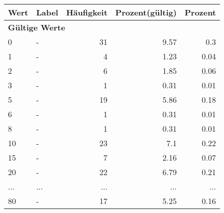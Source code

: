      \begin{longtable}{lXrrr}
     \toprule
     \textbf{Wert} & \textbf{Label} & \textbf{Häufigkeit} & \textbf{Prozent(gültig)} & \textbf{Prozent} \\
     \endhead
     \midrule
     \multicolumn{5}{l}{\textbf{Gültige Werte}}\\
        0 & \multicolumn{1}{X}{-} & %
          \num{31} &
          \num[round-mode=places,round-precision=2]{9,57} &
          \num[round-mode=places,round-precision=2]{0,3} \\
        1 & \multicolumn{1}{X}{-} & %
          \num{4} &
          \num[round-mode=places,round-precision=2]{1,23} &
          \num[round-mode=places,round-precision=2]{0,04} \\
        2 & \multicolumn{1}{X}{-} & %
          \num{6} &
          \num[round-mode=places,round-precision=2]{1,85} &
          \num[round-mode=places,round-precision=2]{0,06} \\
        3 & \multicolumn{1}{X}{-} & %
          \num{1} &
          \num[round-mode=places,round-precision=2]{0,31} &
          \num[round-mode=places,round-precision=2]{0,01} \\
        5 & \multicolumn{1}{X}{-} & %
          \num{19} &
          \num[round-mode=places,round-precision=2]{5,86} &
          \num[round-mode=places,round-precision=2]{0,18} \\
        6 & \multicolumn{1}{X}{-} & %
          \num{1} &
          \num[round-mode=places,round-precision=2]{0,31} &
          \num[round-mode=places,round-precision=2]{0,01} \\
        8 & \multicolumn{1}{X}{-} & %
          \num{1} &
          \num[round-mode=places,round-precision=2]{0,31} &
          \num[round-mode=places,round-precision=2]{0,01} \\
        10 & \multicolumn{1}{X}{-} & %
          \num{23} &
          \num[round-mode=places,round-precision=2]{7,1} &
          \num[round-mode=places,round-precision=2]{0,22} \\
        15 & \multicolumn{1}{X}{-} & %
          \num{7} &
          \num[round-mode=places,round-precision=2]{2,16} &
          \num[round-mode=places,round-precision=2]{0,07} \\
        20 & \multicolumn{1}{X}{-} & %
          \num{22} &
          \num[round-mode=places,round-precision=2]{6,79} &
          \num[round-mode=places,round-precision=2]{0,21} \\
       ... & ... & ... & ... & ... \\
        80 & \multicolumn{1}{X}{-} & %
          \num{17} &
          \num[round-mode=places,round-precision=2]{5,25} &
          \num[round-mode=places,round-precision=2]{0,16} \\


\end{longtable}

